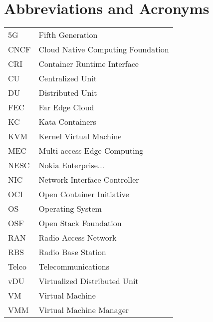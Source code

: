 \chapter*{Abbreviations and Acronyms}

\noindent
\begin{longtable}{@{}p{}p{}@{}}
5G & Fifth Generation \\
CNCF & Cloud Native Computing Foundation \\
CRI & Container Runtime Interface \\
CU & Centralized Unit \\
DU & Distributed Unit \\
FEC & Far Edge Cloud \\
KC & Kata Containers \\
KVM & Kernel Virtual Machine \\
MEC & Multi-access Edge Computing \\
NESC & Nokia Enterprise... \\
NIC & Network Interface Controller \\
OCI & Open Container Initiative \\
OS & Operating System \\
OSF & Open Stack Foundation \\
RAN & Radio Access Network \\
RBS & Radio Base Station \\
Telco & Telecommunications \\
vDU & Virtualized Distributed Unit \\
VM & Virtual Machine \\
VMM & Virtual Machine Manager \\



\end{longtable}
